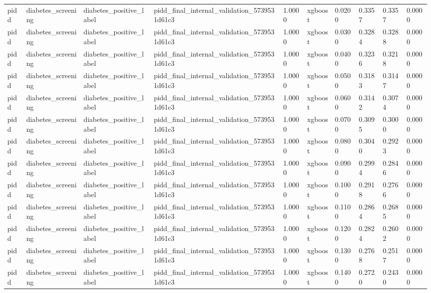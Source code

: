 \begin{tabular}{llllllllll}
pidd & diabetes\_screening & diabetes\_positive\_label & pidd\_final\_internal\_validation\_5739531d61c3 & 1.0000 & xgboost & 0.0200 & 0.3357 & 0.3357 & 0.0000 \\
pidd & diabetes\_screening & diabetes\_positive\_label & pidd\_final\_internal\_validation\_5739531d61c3 & 1.0000 & xgboost & 0.0300 & 0.3284 & 0.3288 & 0.0000 \\
pidd & diabetes\_screening & diabetes\_positive\_label & pidd\_final\_internal\_validation\_5739531d61c3 & 1.0000 & xgboost & 0.0400 & 0.3236 & 0.3218 & 0.0000 \\
pidd & diabetes\_screening & diabetes\_positive\_label & pidd\_final\_internal\_validation\_5739531d61c3 & 1.0000 & xgboost & 0.0500 & 0.3183 & 0.3147 & 0.0000 \\
pidd & diabetes\_screening & diabetes\_positive\_label & pidd\_final\_internal\_validation\_5739531d61c3 & 1.0000 & xgboost & 0.0600 & 0.3142 & 0.3074 & 0.0000 \\
pidd & diabetes\_screening & diabetes\_positive\_label & pidd\_final\_internal\_validation\_5739531d61c3 & 1.0000 & xgboost & 0.0700 & 0.3095 & 0.3000 & 0.0000 \\
pidd & diabetes\_screening & diabetes\_positive\_label & pidd\_final\_internal\_validation\_5739531d61c3 & 1.0000 & xgboost & 0.0800 & 0.3040 & 0.2923 & 0.0000 \\
pidd & diabetes\_screening & diabetes\_positive\_label & pidd\_final\_internal\_validation\_5739531d61c3 & 1.0000 & xgboost & 0.0900 & 0.2994 & 0.2846 & 0.0000 \\
pidd & diabetes\_screening & diabetes\_positive\_label & pidd\_final\_internal\_validation\_5739531d61c3 & 1.0000 & xgboost & 0.1000 & 0.2918 & 0.2766 & 0.0000 \\
pidd & diabetes\_screening & diabetes\_positive\_label & pidd\_final\_internal\_validation\_5739531d61c3 & 1.0000 & xgboost & 0.1100 & 0.2864 & 0.2685 & 0.0000 \\
pidd & diabetes\_screening & diabetes\_positive\_label & pidd\_final\_internal\_validation\_5739531d61c3 & 1.0000 & xgboost & 0.1200 & 0.2824 & 0.2602 & 0.0000 \\
pidd & diabetes\_screening & diabetes\_positive\_label & pidd\_final\_internal\_validation\_5739531d61c3 & 1.0000 & xgboost & 0.1300 & 0.2768 & 0.2517 & 0.0000 \\
pidd & diabetes\_screening & diabetes\_positive\_label & pidd\_final\_internal\_validation\_5739531d61c3 & 1.0000 & xgboost & 0.1400 & 0.2720 & 0.2430 & 0.0000 \\

\end{tabular}
